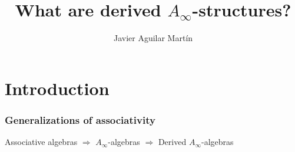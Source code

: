 \documentclass{beamer}
\title{What are derived $A_\infty$-structures?}
\author{Javier Aguilar Mart\'in}
\institute{University of Kent}
\date{}
\theoremstyle{definition}
\begin{document}
\frame{\titlepage}
%
% 
% 
% 

% 



\newcommand{\seti}{\setcounter{saveenumi}{\value{enumi}}}
\newcommand{\conti}{\setcounter{enumi}{\value{saveenumi}}}

\makeatletter
\makeatother


%
%
%
%
%
%
%
\section{Introduction}
\begin{frame}
\frametitle{Generalizations of associativity}

Associative algebras $\Rightarrow$ $A_\infty$-algebras $\Rightarrow$ Derived $A_\infty$-algebras

\end{frame}
\end{document}
